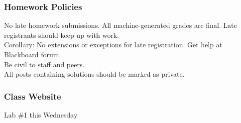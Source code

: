 \documentclass[11pt]{beamer}
\begin{document}
\begin{frame}
  \frametitle{Homework Policies}
  \Enlarge

  \begin{itemize}
    \myitem No late homework submissions. \pause
    \myitem All machine-generated grades are final. \pause
    \myitem Late registrants should keep up with work. \\ \textcolor{\CSGradBot}{\footnotesize\hspace{1em} Corollary:  No extensions or exceptions for late registration.} \pause
    \myitem Get help at Blackboard forum. \\ \textcolor{\CSGradBot}{\footnotesize\hspace{1em} Be civil to staff and peers.}\pause
    							       \\ \textcolor{\CSGradBot}{\footnotesize\hspace{1em} All posts containing solutions should be marked as private.}
  \end{itemize}
\end{frame}

\begin{frame}[plain,c]
  \frametitle{Class Website}
  \Enlarge

  \begin{center}
    \textcolor{\CSBase}{\Huge Lab \#1 this Wednesday}
  \end{center}
\end{frame}
\end{document}
